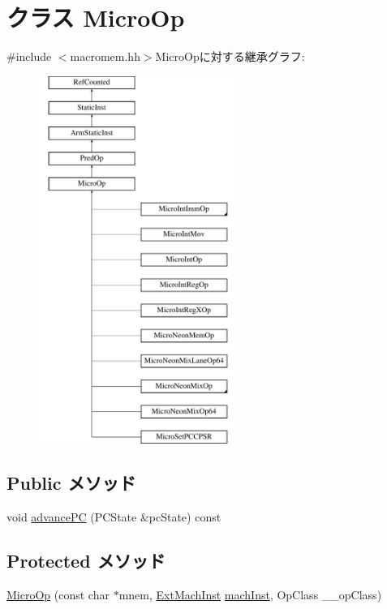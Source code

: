 \hypertarget{classArmISA_1_1MicroOp}{
\section{クラス MicroOp}
\label{classArmISA_1_1MicroOp}
}


{\ttfamily \#include $<$macromem.hh$>$}MicroOpに対する継承グラフ:\begin{figure}[H]
\begin{center}
\leavevmode
\includegraphics[height=12cm]{classArmISA_1_1MicroOp}
\end{center}
\end{figure}
\subsection*{Public メソッド}
\begin{DoxyCompactItemize}
\item 
void \hyperlink{classArmISA_1_1MicroOp_af04cd01429462d48e635f3e01ced6257}{advancePC} (PCState \&pcState) const 
\end{DoxyCompactItemize}
\subsection*{Protected メソッド}
\begin{DoxyCompactItemize}
\item 
\hyperlink{classArmISA_1_1MicroOp_a4fce46491b629156291132a467e8693e}{MicroOp} (const char $\ast$mnem, \hyperlink{classStaticInst_a5605d4fc727eae9e595325c90c0ec108}{ExtMachInst} \hyperlink{classStaticInst_a744598b194ca3d4201d9414ce4cc4af4}{machInst}, OpClass \_\-\_\-opClass)
\end{DoxyCompactItemize}


